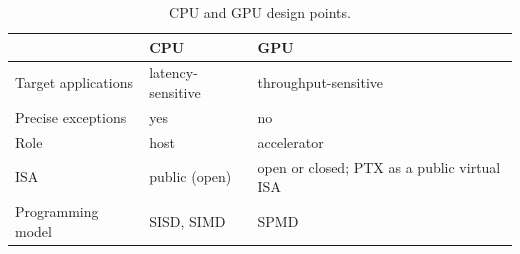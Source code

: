 \documentclass[../main.tex]{subfiles}
\begin{document}
\begin{table}[htbp]
  \centering
  \caption{CPU and GPU design points.}
  \label{tab:l01-cpu-gpu}
  \begin{tabular}{>{\raggedright\arraybackslash}p{36mm}
                  >{\raggedright\arraybackslash}p{36mm}
                  >{\raggedright\arraybackslash}p{36mm}}
    \toprule
    & CPU & GPU \\
    \midrule
    Target applications & latency-sensitive & throughput-sensitive \\
    Precise exceptions & yes & no \\
    Role & host & accelerator \\
    ISA & public (open) & open or closed; PTX as a public virtual ISA \\
    Programming model & SISD, SIMD & SPMD \\
    \bottomrule
  \end{tabular}
\end{table}
\end{document}
